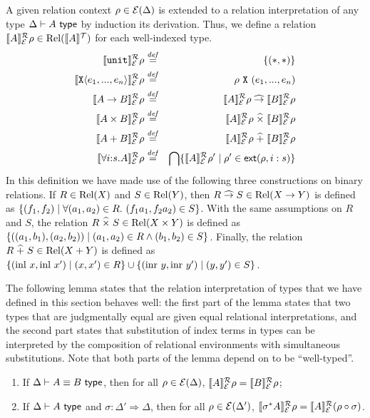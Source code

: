A given relation context $\rho \in \mathcal{E}(\Delta)$ is extended to
a relation interpretation of any type $\Delta \vdash A \textsf{ type}$ by
induction its derivation. Thus, we define a relation
$\llbracket A \rrbracket^{\mathcal{R}}_{\mathcal{E}}{\rho} \in \mathrm{Rel}(\llbracket A \rrbracket^{\mathcal{T}})$ for each well-indexed
type.
\begin{eqnarray*}
  \llbracket \texttt{unit} \rrbracket^{\mathcal{R}}_{\mathcal{E}}{\rho} & \stackrel{\mathit{def}}= & \{(*,*)\} \\
  \llbracket \texttt{X}\langle e_1,...,e_n \rangle \rrbracket^{\mathcal{R}}_{\mathcal{E}}{\rho} & \stackrel{\mathit{def}}= & \rho\ {\texttt{X}}\ (e_1,...,e_n) \\
  \llbracket A \to B \rrbracket^{\mathcal{R}}_{\mathcal{E}}{\rho} & \stackrel{\mathit{def}}= & \llbracket A \rrbracket^{\mathcal{R}}_{\mathcal{E}}{\rho} \mathrel{\widehat\to} \llbracket B \rrbracket^{\mathcal{R}}_{\mathcal{E}}{\rho} \\
  \llbracket A \times B \rrbracket^{\mathcal{R}}_{\mathcal{E}}{\rho} & \stackrel{\mathit{def}}= & \llbracket A \rrbracket^{\mathcal{R}}_{\mathcal{E}}{\rho} \mathrel{\widehat\times} \llbracket B \rrbracket^{\mathcal{R}}_{\mathcal{E}}{\rho} \\
  \llbracket A + B \rrbracket^{\mathcal{R}}_{\mathcal{E}}{\rho} & \stackrel{\mathit{def}}= & \llbracket A \rrbracket^{\mathcal{R}}_{\mathcal{E}}{\rho} \mathrel{\widehat+} \llbracket B \rrbracket^{\mathcal{R}}_{\mathcal{E}}{\rho} \\
  \llbracket \forall i\mathord:s.A \rrbracket^{\mathcal{R}}_{\mathcal{E}}{\rho} & \stackrel{\mathit{def}}= & \bigcap\{ \llbracket A \rrbracket^{\mathcal{R}}_{\mathcal{E}}{\rho}' \mathrel| \rho' \in \mathsf{ext}(\rho,i:s) \}
\end{eqnarray*}
In this definition we have made use of the following three
constructions on binary relations. If $R \in \mathrm{Rel}(X)$ and $S \in
\mathrm{Rel}(Y)$, then $R \mathrel{\widehat\to} S \in \mathrm{Rel}(X \to Y)$ is defined as $\{
(f_1,f_2) \mathrel| \forall (a_1,a_2) \in R.\ (f_1a_1,f_2a_2) \in S
\}$. With the same assumptions on $R$ and $S$, the relation $R
\mathrel{\widehat\times} S \in \mathrm{Rel}(X \times Y)$ is defined as $\{
((a_1,b_1),(a_2,b_2)) \mathrel| (a_1,a_2) \in R \land (b_1,b_2) \in S
\}$. Finally, the relation $R \mathrel{\widehat+} S \in \mathrm{Rel}(X + Y)$ is defined as
$\{ (\mathrm{inl}\ x, \mathrm{inl}\ x') \mathrel| (x,x') \in R \} \cup
\{ (\mathrm{inr}\ y, \mathrm{inr}\ y') \mathrel| (y,y') \in S \}$.

The following lemma states that the relation interpretation of types
that we have defined in this section behaves well: the first part of
the lemma states that two types that are judgmentally equal are given
equal relational interpretations, and the second part states that
substitution of index terms in types can be interpreted by the
composition of relational environments with simultaneous
substitutions. Note that both parts of the lemma depend on
 to be ``well-typed''.
\begin{lemma}\label{lem:tyeqsubst-relational}
  \begin{enumerate}
  \item If $\Delta \vdash A \equiv B \textsf{ type}$, then for all $\rho \in
    \mathcal{E}(\Delta)$, $\llbracket A \rrbracket^{\mathcal{R}}_{\mathcal{E}}{\rho} =
    \llbracket B \rrbracket^{\mathcal{R}}_{\mathcal{E}}{\rho}$;
  \item If $\Delta \vdash A \textsf{ type}$ and $\sigma : \Delta' \Rightarrow
    \Delta$, then for all $\rho \in \mathcal{E}(\Delta')$,
    $\llbracket \sigma^*A \rrbracket^{\mathcal{R}}_{\mathcal{E}}{\rho} = \llbracket A \rrbracket^{\mathcal{R}}_{\mathcal{E}}{(}\rho
    \circ \sigma)$.
  \end{enumerate}
\end{lemma}

